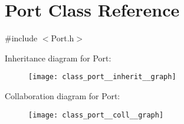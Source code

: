 \hypertarget{class_port}{}\section{Port Class Reference}
\label{class_port}


{\ttfamily \#include $<$Port.\+h$>$}



Inheritance diagram for Port\+:
\nopagebreak
\begin{figure}[H]
\begin{center}
\leavevmode
\texttt{[image: class\_port\_\_inherit\_\_graph]}
\end{center}
\end{figure}


Collaboration diagram for Port\+:
\nopagebreak
\begin{figure}[H]
\begin{center}
\leavevmode
\texttt{[image: class\_port\_\_coll\_\_graph]}
\end{center}
\end{figure}
